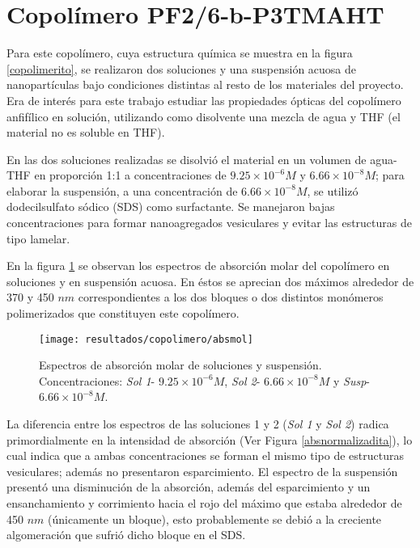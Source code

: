 \section{Copol\'imero PF2/6-b-P3TMAHT}

Para este copol\'imero, cuya estructura qu\'imica se muestra en la figura \ref{copolimerito}, se realizaron dos soluciones y una suspensi\'on acuosa de nanopart\'iculas bajo condiciones distintas al resto de los materiales del proyecto. Era de inter\'es para este trabajo estudiar las propiedades \'opticas del copol\'imero anfif\'ilico en soluci\'on, utilizando como disolvente una mezcla de agua y THF (el material no es soluble en THF). 

En las dos soluciones realizadas se disolvi\'o el material en un volumen de agua- THF en proporci\'on 1:1 a concentraciones de $9.25 \times 10 ^{-6} M$ y $6.66\times 10^{-8} M$; para elaborar la suspensi\'on, a una concentraci\'on de $6.66\times 10^{-8} M$, se utiliz\'o dodecilsulfato s\'odico (SDS) como surfactante. Se manejaron bajas concentraciones para formar nanoagregados vesiculares y evitar las estructuras de tipo lamelar\cite{scherf}.

En la figura \ref{abscopo} se observan los espectros de absorci\'on molar del copol\'imero en soluciones y en suspensi\'on acuosa. En \'estos se aprecian dos m\'aximos alrededor de 370 y 450 $nm$ correspondientes a los dos bloques o dos distintos mon\'omeros polimerizados que constituyen este copol\'imero.

\begin{figure}[h]
\centering
\texttt{[image: resultados/copolimero/absmol]}
\caption{Espectros de absorci\'on molar de soluciones y suspensi\'on. Concentraciones: \emph{Sol 1}- $9.25 \times 10 ^{-6} M$, \emph{Sol 2}- $6.66\times 10^{-8} M$ y \emph{Susp}- $6.66\times 10^{-8} M$.}\label{abscopo}
\end{figure}

La diferencia entre los espectros de las soluciones 1 y 2 (\emph{Sol 1} y \emph{Sol 2}) radica primordialmente en la intensidad de absorci\'on (Ver Figura \ref{absnormalizadita}), lo cual indica que a ambas concentraciones se forman el mismo tipo de estructuras vesiculares; adem\'as no presentaron esparcimiento. El espectro de la suspensi\'on present\'o una disminuci\'on de la absorci\'on, adem\'as del esparcimiento y un ensanchamiento y corrimiento hacia el rojo del m\'aximo que estaba alrededor de 450 $nm$ (\'unicamente un bloque), esto probablemente se debi\'o a la creciente algomeraci\'on que sufri\'o dicho bloque en el SDS.
 
